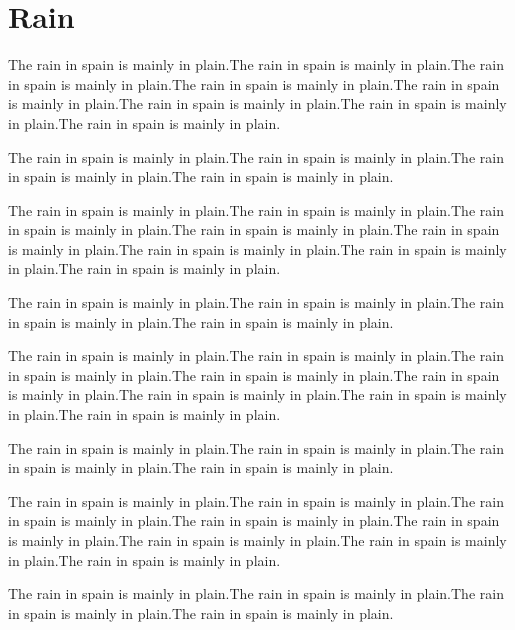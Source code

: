 \chapter{Rain}

\begin{figure}[b]
\end{figure}

The rain in spain is mainly in plain.The rain in spain is mainly in plain.The rain in spain is mainly in plain.The rain in spain is mainly in plain.The rain in spain is mainly in plain.The rain in spain is mainly in plain.The rain in spain is mainly in plain.The rain in spain is mainly in plain.

The rain in spain is mainly in plain.The rain in spain is mainly in plain.The rain in spain is mainly in plain.The rain in spain is mainly in plain.

The rain in spain is mainly in plain.The rain in spain is mainly in plain.The rain in spain is mainly in plain.The rain in spain is mainly in plain.The rain in spain is mainly in plain.The rain in spain is mainly in plain.The rain in spain is mainly in plain.The rain in spain is mainly in plain.

The rain in spain is mainly in plain.The rain in spain is mainly in plain.The rain in spain is mainly in plain.The rain in spain is mainly in plain.

The rain in spain is mainly in plain.The rain in spain is mainly in plain.The rain in spain is mainly in plain.The rain in spain is mainly in plain.The rain in spain is mainly in plain.The rain in spain is mainly in plain.The rain in spain is mainly in plain.The rain in spain is mainly in plain.

The rain in spain is mainly in plain.The rain in spain is mainly in plain.The rain in spain is mainly in plain.The rain in spain is mainly in plain.

The rain in spain is mainly in plain.The rain in spain is mainly in plain.The rain in spain is mainly in plain.The rain in spain is mainly in plain.The rain in spain is mainly in plain.The rain in spain is mainly in plain.The rain in spain is mainly in plain.The rain in spain is mainly in plain.

The rain in spain is mainly in plain.The rain in spain is mainly in plain.The rain in spain is mainly in plain.The rain in spain is mainly in plain.